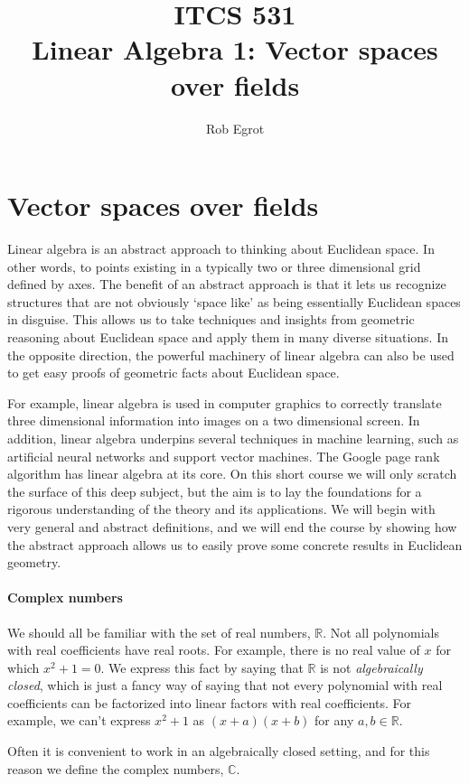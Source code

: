 \documentclass{article}
\title{ITCS 531 \\Linear Algebra 1: Vector spaces over fields}
\author{Rob Egrot}
\date{}
\theoremstyle{plain}
\newcommand{\bC}{\mathbb{C}}
\newcommand{\bR}{\mathbb{R}}
\begin{document}
\maketitle
\section{Vector spaces over fields}

Linear algebra is an abstract approach to thinking about Euclidean space. In other words, to points existing in a typically two or three dimensional grid defined by axes. The benefit of an abstract approach is that it lets us recognize structures that are not obviously `space like' as being essentially Euclidean spaces in disguise. This allows us to take techniques and insights from geometric reasoning about Euclidean space and apply them in many diverse situations. In the opposite direction, the powerful machinery of linear algebra can also be used to get easy proofs of geometric facts about Euclidean space.

For example, linear algebra is used in computer graphics to correctly translate three dimensional information into images on a two dimensional screen. In addition, linear algebra underpins several techniques in machine learning, such as artificial neural networks and support vector machines. The Google page rank algorithm has linear algebra at its core. On this short course we will only scratch the surface of this deep subject, but the aim is to lay the foundations for a rigorous understanding of the theory and its applications. We will begin with very general and abstract definitions, and we will end the course by showing how the abstract approach allows us to easily prove some concrete results in Euclidean geometry. 
 
\paragraph{Complex numbers}
We should all be familiar with the set of real numbers, $\bR$. Not all polynomials with real coefficients have real roots. For example, there is no real value of $x$ for which $x^2 + 1 = 0$. We express this fact by saying that $\bR$ is not \emph{algebraically closed}, which is just a fancy way of saying that not every polynomial with real coefficients can be factorized into linear factors with real coefficients. For example, we can't express $x^2 +1$ as $(x +a)(x+b)$ for any $a,b\in\bR$. 

Often it is convenient to work in an algebraically closed setting, and for this reason we define the complex numbers, $\bC$.
\end{document}

